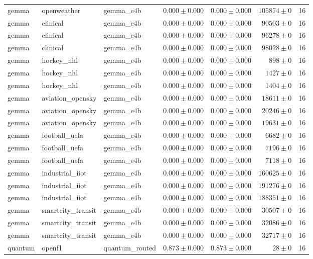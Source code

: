 \begin{table}[htbp]
\begin{tabular}{l l l r r r r}
gemma & openweather & gemma\_e4b & $0.000\pm0.000$ & $0.000\pm0.000$ & $105874\pm0$ & 16 \\
gemma & clinical & gemma\_e4b & $0.000\pm0.000$ & $0.000\pm0.000$ & $90503\pm0$ & 16 \\
gemma & clinical & gemma\_e4b & $0.000\pm0.000$ & $0.000\pm0.000$ & $96278\pm0$ & 16 \\
gemma & clinical & gemma\_e4b & $0.000\pm0.000$ & $0.000\pm0.000$ & $98028\pm0$ & 16 \\
gemma & hockey\_nhl & gemma\_e4b & $0.000\pm0.000$ & $0.000\pm0.000$ & $898\pm0$ & 16 \\
gemma & hockey\_nhl & gemma\_e4b & $0.000\pm0.000$ & $0.000\pm0.000$ & $1427\pm0$ & 16 \\
gemma & hockey\_nhl & gemma\_e4b & $0.000\pm0.000$ & $0.000\pm0.000$ & $1404\pm0$ & 16 \\
gemma & aviation\_opensky & gemma\_e4b & $0.000\pm0.000$ & $0.000\pm0.000$ & $18611\pm0$ & 16 \\
gemma & aviation\_opensky & gemma\_e4b & $0.000\pm0.000$ & $0.000\pm0.000$ & $20246\pm0$ & 16 \\
gemma & aviation\_opensky & gemma\_e4b & $0.000\pm0.000$ & $0.000\pm0.000$ & $19631\pm0$ & 16 \\
gemma & football\_uefa & gemma\_e4b & $0.000\pm0.000$ & $0.000\pm0.000$ & $6682\pm0$ & 16 \\
gemma & football\_uefa & gemma\_e4b & $0.000\pm0.000$ & $0.000\pm0.000$ & $7196\pm0$ & 16 \\
gemma & football\_uefa & gemma\_e4b & $0.000\pm0.000$ & $0.000\pm0.000$ & $7118\pm0$ & 16 \\
gemma & industrial\_iiot & gemma\_e4b & $0.000\pm0.000$ & $0.000\pm0.000$ & $160625\pm0$ & 16 \\
gemma & industrial\_iiot & gemma\_e4b & $0.000\pm0.000$ & $0.000\pm0.000$ & $191276\pm0$ & 16 \\
gemma & industrial\_iiot & gemma\_e4b & $0.000\pm0.000$ & $0.000\pm0.000$ & $188351\pm0$ & 16 \\
gemma & smartcity\_transit & gemma\_e4b & $0.000\pm0.000$ & $0.000\pm0.000$ & $30507\pm0$ & 16 \\
gemma & smartcity\_transit & gemma\_e4b & $0.000\pm0.000$ & $0.000\pm0.000$ & $32086\pm0$ & 16 \\
gemma & smartcity\_transit & gemma\_e4b & $0.000\pm0.000$ & $0.000\pm0.000$ & $32717\pm0$ & 16 \\
quantum & openf1 & quantum\_routed & $0.873\pm0.000$ & $0.873\pm0.000$ & $28\pm0$ & 16 \\

\end{tabular}
\end{table}
